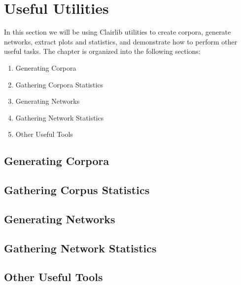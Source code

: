 \section{Useful Utilities}

In this section we will be using Clairlib utilities to create corpora, generate networks, extract plots and statistics, and demonstrate how to perform other useful tasks.  The chapter is organized into the following sections:

\begin{enumerate}
 \item Generating Corpora
 \item Gathering Corpora Statistics
 \item Generating Networks
 \item Gathering Network Statistics
 \item Other Useful Tools
\end{enumerate}

\subsection{Generating Corpora}
			
		
		
		
		

\subsection{Gathering Corpus Statistics}

			
			

\subsection{Generating Networks}

				
		

\subsection{Gathering Network Statistics}

		
				
		

\subsection{Other Useful Tools}

	
	
	
	
